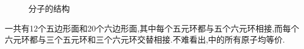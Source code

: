 \documentclass[draft]{ctexart}
\begin{document}
\begin{figure}[H]
{\begin{minipage}[b]{.3\linewidth}
        \end{minipage}
    }
    \vspace{-10pt}\caption{分子的结构}
\end{figure}
一共有12个五边形面和20个六边形面,其中每个五元环都与五个六元环相接,而每个六元环都与三个五元环和三个六元环交替相接.不难看出,中的所有原子均等价.
\end{document}
